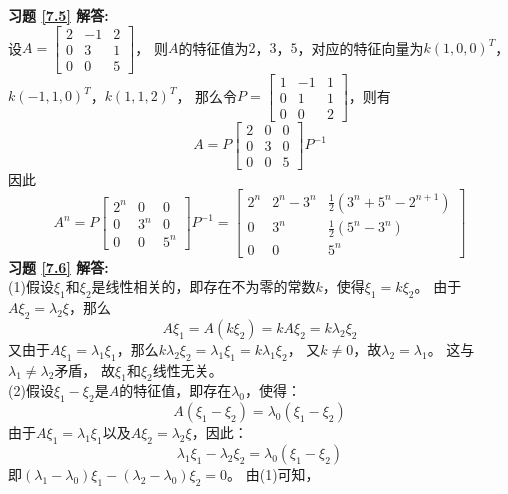 \documentclass[a4paper]{book}
\begin{document}
\textbf{习题 \ref{7.5} 解答:}\\
设$A=\begin{bmatrix}2&-1&2\\0&3&1\\0&0&5\end{bmatrix}$，
则$A$的特征值为$2$，$3$，$5$，对应的特征向量为$k(1,0,0)^T$，
$k(-1,1,0)^T$，$k(1,1,2)^T$，
那么令$P=\begin{bmatrix}1&-1&1\\0&1&1\\0&0&2\end{bmatrix}$，则有
\begin{equation*}
A=P\begin{bmatrix}2&0&0\\0&3&0\\0&0&5\end{bmatrix}P^{-1}
\end{equation*}
因此
\begin{equation*}
A^{n}=P\begin{bmatrix}2^{n}&0&0\\0&3^{n}&0\\0&0&5^{n}\end{bmatrix}P^{-1}
=\begin{bmatrix}2^{n}&2^n-3^n&\frac{1}{2}(3^n+5^n-2^{n+1})\\0&3^n&\frac{1}{2}(5^n-3^n)\\0&0&5^n\end{bmatrix}
\end{equation*}
\textbf{习题 \ref{7.6} 解答:}\\
(1)假设$\xi_1$和$\xi_2$是线性相关的，即存在不为零的常数$k$，使得$\xi_1=k\xi_2$。
由于$A\xi_2=\lambda_2\xi$，那么
\begin{equation*}
  A\xi_1=A(k\xi_2)=kA\xi_2=k\lambda_2\xi_2
\end{equation*}
又由于$A\xi_1=\lambda_1\xi_1$，那么$k\lambda_2\xi_2=\lambda_1\xi_1=k\lambda_1\xi_2$，
又$k\neq0$，故$\lambda_2=\lambda_1$。 这与$\lambda_1\neq\lambda_2$矛盾，
故$\xi_1$和$\xi_2$线性无关。\\
(2)假设$\xi_1-\xi_2$是$A$的特征值，即存在$\lambda_0$，使得：
\begin{equation*}
  A(\xi_1-\xi_2)=\lambda_0(\xi_1-\xi_2)
\end{equation*}
由于$A\xi_1=\lambda_1\xi_1$以及$A\xi_2=\lambda_2\xi$，因此：
\begin{equation*}
  \lambda_1\xi_1-\lambda_2\xi_2=\lambda_0(\xi_1-\xi_2)
\end{equation*}
即$(\lambda_1-\lambda_0)\xi_1-(\lambda_2-\lambda_0)\xi_2=0$。 由(1)可知，
\end{document}
